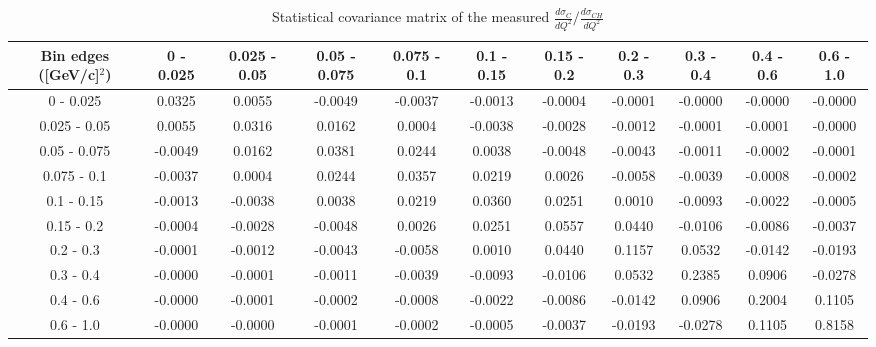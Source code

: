 \documentclass[aps,prl,twocolumn,superscriptaddress,nofootinbib]{revtex4-1}
\begin{document}
\begin{table}[h!]
  \centering
  \caption{Statistical covariance matrix of the measured $\frac{d\sigma_{C}}{dQ^{2}}/\frac{d\sigma_{CH}}{dQ^{2}}$}
    \begin{tabular}{c||cccccccccc}
      Bin edges ([GeV/c]$^{2}$) & 0 - 0.025 & 0.025 - 0.05 & 0.05 - 0.075 & 0.075 - 0.1 & 0.1 - 0.15 & 0.15 - 0.2 & 0.2 - 0.3 & 0.3 - 0.4 & 0.4 - 0.6 & 0.6 - 1.0 \\
\hline \hline
         0 - 0.025 &  0.0325 &  0.0055 & -0.0049 & -0.0037 & -0.0013 & -0.0004 & -0.0001 & -0.0000 & -0.0000 & -0.0000 \\
      0.025 - 0.05 &  0.0055 &  0.0316 &  0.0162 &  0.0004 & -0.0038 & -0.0028 & -0.0012 & -0.0001 & -0.0001 & -0.0000 \\
      0.05 - 0.075 & -0.0049 &  0.0162 &  0.0381 &  0.0244 &  0.0038 & -0.0048 & -0.0043 & -0.0011 & -0.0002 & -0.0001 \\
       0.075 - 0.1 & -0.0037 &  0.0004 &  0.0244 &  0.0357 &  0.0219 &  0.0026 & -0.0058 & -0.0039 & -0.0008 & -0.0002 \\
        0.1 - 0.15 & -0.0013 & -0.0038 &  0.0038 &  0.0219 &  0.0360 &  0.0251 &  0.0010 & -0.0093 & -0.0022 & -0.0005 \\
        0.15 - 0.2 & -0.0004 & -0.0028 & -0.0048 &  0.0026 &  0.0251 &  0.0557 &  0.0440 & -0.0106 & -0.0086 & -0.0037 \\
         0.2 - 0.3 & -0.0001 & -0.0012 & -0.0043 & -0.0058 &  0.0010 &  0.0440 &  0.1157 &  0.0532 & -0.0142 & -0.0193 \\
         0.3 - 0.4 & -0.0000 & -0.0001 & -0.0011 & -0.0039 & -0.0093 & -0.0106 &  0.0532 &  0.2385 &  0.0906 & -0.0278 \\
         0.4 - 0.6 & -0.0000 & -0.0001 & -0.0002 & -0.0008 & -0.0022 & -0.0086 & -0.0142 &  0.0906 &  0.2004 &  0.1105 \\
         0.6 - 1.0 & -0.0000 & -0.0000 & -0.0001 & -0.0002 & -0.0005 & -0.0037 & -0.0193 & -0.0278 &  0.1105 &  0.8158 \\
    \end{tabular}
  \label{tablecov:C_Statistical_Q2}
\end{table}
\end{document}
